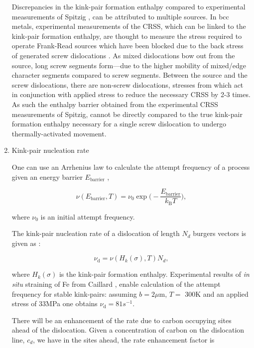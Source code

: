 \documentclass[a4paper,12pt,oneside,print,numbered,index,PageStyleIII]{PhDThesisPSnPDF}
\begin{document}
\begin{enumerate}
Discrepancies in the kink-pair formation enthalpy compared to experimental
measurements of Spitzig \cite{Spitzig_1970}, can be attributed to multiple
sources. In bcc metals, experimental measurements of the CRSS, which can be
linked to the kink-pair formation enthalpy, are thought to measure the
stress required to operate Frank-Read sources which have been blocked due to
the back stress of generated screw dislocations \cite{Groger2007}. As mixed
dislocations bow out from the source, long screw segments form---due to the
higher mobility of mixed/edge character segments compared to screw
segments. Between the source and the screw dislocations, there are non-screw
dislocations, stresses from which act in conjunction with applied stress to
reduce the necessary CRSS by 2-3 times. As such the enthalpy barrier
obtained from the experimental CRSS measurements of Spitzig, cannot be
directly compared to the true kink-pair formation enthalpy necessary for a
single screw dislocation to undergo thermally-activated movement.

\item Kink-pair nucleation rate
\label{sec:org1daff70}
\label{sec:kink-pair_nucleation_rate}

One can use an Arrhenius law to calculate the attempt frequency of a process given an
energy barrier \(E_{\text{barrier} }\) \cite{Henkelman2000},

\begin{equation} \label{eq:jumprate}
   \nu ( E_{\text{barrier}},T ) = \nu_0 \exp \big( - \frac{ E_{\text{barrier} }}{ k_{\text{B}} T} \big),
\end{equation}

where \(\nu_0\) is an initial attempt frequency.

The kink-pair nucleation rate of a dislocation of length \(N_d\) burgers vectors is
given as \cite{itakura13_effec_hydrog_atoms_screw_disloc}:


\begin{equation} \label{eq:kinkrate}
\nu_{\text{d}} = \nu ( H_k(\sigma),T ) N_d,
\end{equation}

where \(H_k(\sigma)\) is the kink-pair formation
enthalpy. Experimental results of \emph{in situ} straining of Fe from Caillard
\cite{Caillard2010}, enable calculation of the attempt frequency for stable
kink-pairs: assuming \(b = 2\mu\text{m}\), \(T=\) 300K and an applied stress of
33MPa one obtains \(\nu_{\text{d} } = 81s^{-1}\).

There will be an enhancement of the rate due to carbon occupying sites ahead
of the dislocation. Given a concentration of carbon on the dislocation line, \(c_d\), we
have in the sites ahead, the rate enhancement factor is


\end{enumerate}
\end{document}
